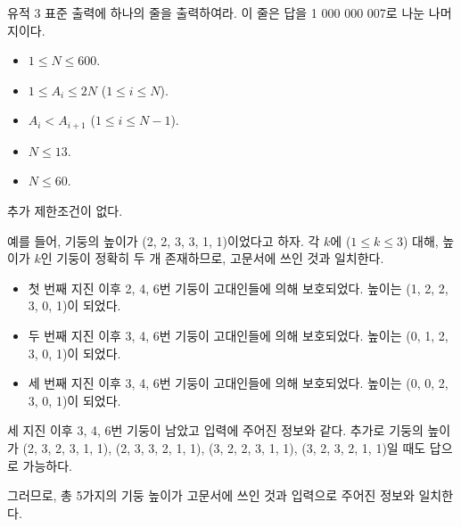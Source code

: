\begin{problem}{유적 3}
	표준 출력에 하나의 줄을 출력하여라. 이 줄은 답을 1 000 000 007로 나눈 나머지이다.
	
	

	\Constraints


	\begin{itemize}
		
		\item $1 \le N \le 600$.
		\item $1 \le A_i \le 2N$ ($1 \le i \le N$).
		\item $A_i < A_{i+1}$ ($1 \le i \le N-1$).
	\end{itemize}


	\begin{itemize}
		\item $N \le 13$.
	\end{itemize}

	
	\begin{itemize}
		\item $N \le 60$.
	\end{itemize}
	
	
	추가 제한조건이 없다.
		
	\Examples
		
	\begin{example}
\end{example}

	예를 들어, 기둥의 높이가 (2, 2, 3, 3, 1, 1)이었다고 하자. 각 $k$에 ($1 \le k \le 3$) 대해, 높이가 $k$인 기둥이 정확히 두 개 존재하므로, 고문서에 쓰인 것과 일치한다.

	\begin{itemize}
		\item 첫 번째 지진 이후 2, 4, 6번 기둥이 고대인들에 의해 보호되었다. 높이는 (1, 2, 2, 3, 0, 1)이 되었다.
		\item 두 번째 지진 이후 3, 4, 6번 기둥이 고대인들에 의해 보호되었다. 높이는 (0, 1, 2, 3, 0, 1)이 되었다.
		\item 세 번째 지진 이후 3, 4, 6번 기둥이 고대인들에 의해 보호되었다. 높이는 (0, 0, 2, 3, 0, 1)이 되었다.

	\end{itemize}

	세 지진 이후 3, 4, 6번 기둥이 남았고 입력에 주어진 정보와 같다. 추가로 기둥의 높이가 (2, 3, 2, 3, 1, 1), (2, 3, 3, 2, 1, 1), (3, 2, 2, 3, 1, 1), (3, 2, 3, 2, 1, 1)일 때도 답으로 가능하다.
	
	그러므로, 총 5가지의 기둥 높이가 고문서에 쓰인 것과 입력으로 주어진 정보와 일치한다.



\end{problem}
